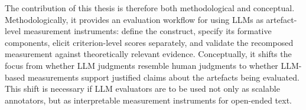 The contribution of this thesis is therefore both methodological and conceptual. Methodologically, it provides an evaluation workflow for using LLMs as artefact-level measurement instruments: define the construct, specify its formative components, elicit criterion-level scores separately, and validate the recomposed measurement against theoretically relevant evidence. Conceptually, it shifts the focus from whether LLM judgments resemble human judgments to whether LLM-based measurements support justified claims about the artefacts being evaluated. This shift is necessary if LLM evaluators are to be used not only as scalable annotators, but as interpretable measurement instruments for open-ended text.






